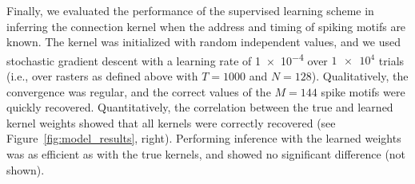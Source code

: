 \documentclass[runningheads]{llncs}
\begin{document}
Finally, we evaluated the performance of the supervised learning scheme in inferring the connection kernel when the address and timing of spiking motifs are known. The kernel was initialized with random independent values, and we used stochastic gradient descent with a learning rate of \num{1e-4} over $\num{1e4}$ trials (i.e., over rasters as defined above with $T=1000$ and $N=128$). Qualitatively, the convergence was regular, and the correct values of the $M=144$ spike motifs were quickly recovered. Quantitatively, the correlation between the true and learned kernel weights showed that all kernels were correctly recovered (see Figure~\ref{fig:model_results}, right). Performing inference with the learned weights was as efficient as with the true kernels, and showed no significant difference (not shown).

\end{document}
